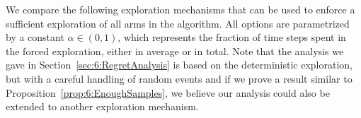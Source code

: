 %

We compare the following exploration mechanisms that can be used to enforce a sufficient exploration of all arms in the \GLRklUCB{} algorithm.
All options are parametrized by a constant $\alpha\in(0,1)$, which represents the fraction of time steps spent in the forced exploration, either in average or in total.
%
Note that the analysis we gave in Section~\ref{sec:6:RegretAnalysis} is based on the deterministic exploration, but with a careful handling of random events and if we prove a result similar to Proposition~\ref{prop:6:EnoughSamples}, we believe our analysis could also be extended to another exploration mechanism.

